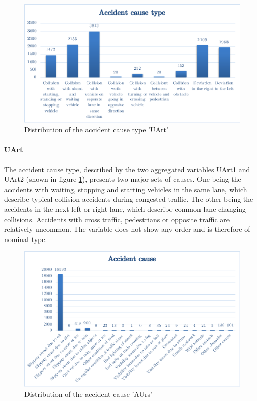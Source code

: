 \documentclass[a4paper,12pt]{report}
\begin{document}
\begin{figure}[h]
	\centering
	\includegraphics[scale=0.6]{./assets/baysis_dataset_UArt.pdf}
	\caption{Distribution of the accident cause type 'UArt'}
	\label{img:baysis_dataset_UArt}
\end{figure}

\paragraph{UArt}
The accident cause type, described by the two aggregated variables UArt1 and UArt2 (shown in figure \ref{img:baysis_dataset_UArt}), presents two major sets of causes. One being the accidents with waiting, stopping and starting vehicles in the same lane, which describe typical collision accidents during congested traffic. The other being the accidents in the next left or right lane, which describe common lane changing collisions. Accidents with cross traffic, pedestrians or opposite traffic are relatively uncommon. The variable does not show any order and is therefore of nominal type.

\begin{figure}[h]
	\centering
	\includegraphics[scale=0.7]{./assets/baysis_dataset_AUrs.pdf}
	\caption{Distribution of the accident cause 'AUrs'}
	\label{img:baysis_dataset_AUrs}
\end{figure}
\end{document}
